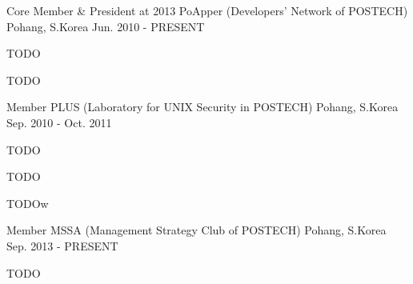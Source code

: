 \begin{cventries}
  \cventry
    {Core Member \& President at 2013}
    {PoApper (Developers' Network of POSTECH)}
    {Pohang, S.Korea}
    {Jun. 2010 - PRESENT}
    {
      \begin{cvitems}
        \item {TODO}
        \item {TODO}
      \end{cvitems}
    }
  \cventry
    {Member}
    {PLUS (Laboratory for UNIX Security in POSTECH)}
    {Pohang, S.Korea}
    {Sep. 2010 - Oct. 2011}
    {
      \begin{cvitems}
        \item {TODO}
        \item {TODO}
        \item {TODO}w
      \end{cvitems}
    }
  \cventry
    {Member}
    {MSSA (Management Strategy Club of POSTECH)}
    {Pohang, S.Korea}
    {Sep. 2013 - PRESENT}
    {
      \begin{cvitems}
        \item {TODO}
      \end{cvitems}
    }
\end{cventries}
